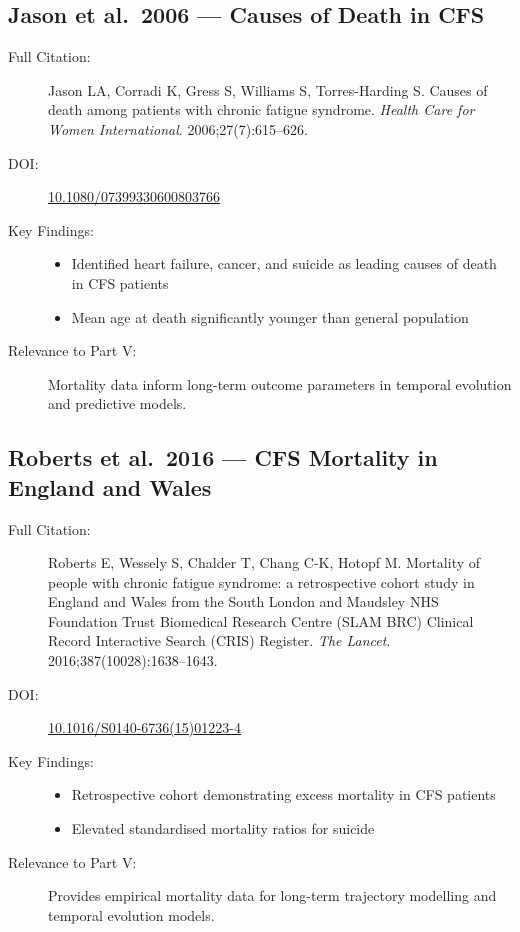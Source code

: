 \subsection{Jason et al.\ 2006 --- Causes of Death in CFS}

\begin{description}
    \item[Full Citation:] Jason LA, Corradi K, Gress S, Williams S, Torres-Harding S. Causes of death among patients with chronic fatigue syndrome. \textit{Health Care for Women International}. 2006;27(7):615--626. \cite{Jason2006}
    \item[DOI:] \href{https://doi.org/10.1080/07399330600803766}{10.1080/07399330600803766}
    \item[Key Findings:]
    \begin{itemize}
        \item Identified heart failure, cancer, and suicide as leading causes of death in CFS patients
        \item Mean age at death significantly younger than general population
    \end{itemize}
    \item[Relevance to Part V:] Mortality data inform long-term outcome parameters in temporal evolution and predictive models.
\end{description}

\subsection{Roberts et al.\ 2016 --- CFS Mortality in England and Wales}

\begin{description}
    \item[Full Citation:] Roberts E, Wessely S, Chalder T, Chang C-K, Hotopf M. Mortality of people with chronic fatigue syndrome: a retrospective cohort study in England and Wales from the South London and Maudsley NHS Foundation Trust Biomedical Research Centre (SLAM BRC) Clinical Record Interactive Search (CRIS) Register. \textit{The Lancet}. 2016;387(10028):1638--1643. \cite{Roberts2016}
    \item[DOI:] \href{https://doi.org/10.1016/S0140-6736(15)01223-4}{10.1016/S0140-6736(15)01223-4}
    \item[Key Findings:]
    \begin{itemize}
        \item Retrospective cohort demonstrating excess mortality in CFS patients
        \item Elevated standardised mortality ratios for suicide
    \end{itemize}
    \item[Relevance to Part V:] Provides empirical mortality data for long-term trajectory modelling and temporal evolution models.
\end{description}

